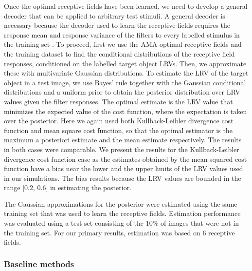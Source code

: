 \documentclass{jov}
\begin{document}
Once the optimal receptive fields have been learned, we need to develop a general decoder that can be applied to arbitrary test stimuli.
A general decoder is necessary because the decoder used to learn the receptive fields requires the response mean and response variance of the filters to every labelled stimulus in the training set \cite{geisler2009optimal,burge2017accuracy}.
To proceed, first we use the AMA optimal receptive fields and the training dataset to find the conditional distributions of the receptive field responses, conditioned on the labelled target object LRVs.
Then, we approximate these with multivariate Gaussian distributions.
To estimate the LRV of the target object in a test image, we use Bayes' rule together with the Gaussian conditional distributions and a uniform prior to obtain the posterior distribution over LRV values given the filter responses.
The optimal estimate is the LRV value that minimizes the expected value of the cost function, where the expectation is taken over the posterior.
Here we again used both Kullback-Leibler divergence cost function and mean square cost function, so that the optimal estimator is the maximum a posteriori estimate and the mean estimate respectively.
The results in both cases were comparable.
We present the results for the Kullback-Leibler divergence cost function case as the estimates obtained by the mean squared cost function have a bias near the lower and the upper limits of the LRV values used in our simulations. 
The bias results because the LRV values are bounded in the range [0.2, 0.6] in estimating the posterior.

The Gaussian approximations for the posterior were estimated using the same training set that was used to learn the receptive fields.
Estimation performance was evaluated using a test set consisting of the 10\% of images that were not in the training set.
For our primary results, estimation was based on 6 receptive fields.

\subsubsection*{Baseline methods}
\end{document}
